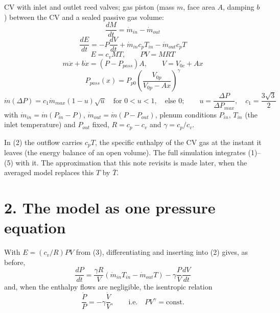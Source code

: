 \documentclass[11pt]{article}
\begin{document}
CV with inlet and outlet reed valves; gas piston (mass $m$, face area $A$, damping $b$) between the CV and a sealed passive gas volume:
\begin{equation}
\frac{dM}{dt} = \dot m_{in} - \dot m_{out} \tag{1}
\end{equation}
\begin{equation}
\frac{dE}{dt} = -P\frac{dV}{dt} + \dot m_{in}c_pT_{in} - \dot m_{out}c_pT \tag{2}
\end{equation}
\begin{equation}
E = c_vMT, \qquad PV = MRT \tag{3}
\end{equation}
\begin{equation}
m\ddot x + b\dot x = (P - P_{pass})A, \qquad V = V_{0c} + Ax \tag{4}
\end{equation}
\begin{equation}
P_{pass}(x) = P_{p0}\left(\frac{V_{0p}}{V_{0p} - Ax}\right)^{\gamma} \tag{5}
\end{equation}
\begin{equation}
\dot m(\Delta P) = c_1\dot m_{max}(1-u)\sqrt u \quad \text{for } 0 < u < 1, \quad \text{else } 0; \qquad u = \frac{\Delta P}{\Delta P_{max}}, \quad c_1 = \frac{3\sqrt 3}{2} \tag{6}
\end{equation}
with $\dot m_{in} = \dot m(P_{in} - P)$, $\dot m_{out} = \dot m(P - P_{out})$, plenum conditions $P_{in}$, $T_{in}$ (the inlet temperature) and $P_{out}$ fixed, $R = c_p - c_v$ and $\gamma = c_p/c_v$.

In (2) the outflow carries $c_pT$, the specific enthalpy of the CV gas at the instant it leaves (the energy balance of an open volume). The full simulation integrates (1)--(5) with it. The approximation that this note revisits is made later, when the averaged model replaces this $T$ by $\bar T$.

\section*{2. The model as one pressure equation}

With $E = (c_v/R)PV$ from (3), differentiating and inserting into (2) gives, as before,
\begin{equation}
\frac{dP}{dt} = \frac{\gamma R}{V}\left(\dot m_{in}T_{in} - \dot m_{out}T\right) - \gamma\frac{P}{V}\frac{dV}{dt} \tag{7}
\end{equation}
and, when the enthalpy flows are negligible, the isentropic relation
\begin{equation}
\frac{\dot P}{P} = -\gamma\frac{\dot V}{V}, \qquad \text{i.e.} \quad PV^{\gamma} = \text{const} . \tag{8}
\end{equation}
\end{document}
